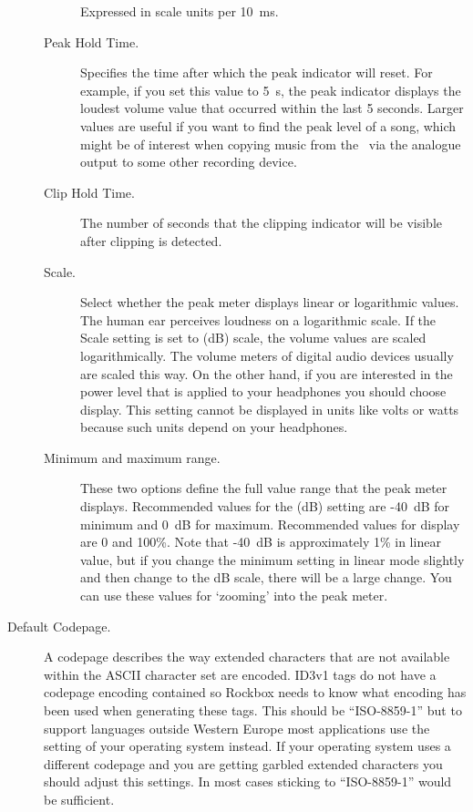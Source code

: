 \begin{description}
\begin{description}
      Expressed in scale units per 10~ms.
    \item[Peak Hold Time.]
      Specifies the time after which the peak indicator will reset.
      For example, if you set this value to 5~s, the peak indicator displays
      the loudest volume value that occurred within the last 5 seconds.
      Larger values are useful if you want to find the peak level of a song,
      which might be of interest when copying music from the \dap\ via the
      analogue output to some other recording device.
    \item[Clip Hold Time.]
      The number of seconds that the clipping indicator will be visible
      after clipping is detected.
    \item[Scale.]
      Select whether the peak meter displays linear or logarithmic values.
      The human ear perceives loudness on a logarithmic scale. If the Scale
      setting is set to  (dB) scale, the volume values
      are scaled logarithmically. The volume meters of digital audio
      devices usually are scaled this way. On the other hand, if you
      are interested in the power level that is applied to your headphones
      you should choose  display. This setting cannot be
      displayed in units like volts or watts because such units depend
      on your headphones.
    \item[Minimum and maximum range.]
      These two options define the full value range that the peak meter
      displays. Recommended values for the  (dB) setting
      are {}-40~dB for minimum and 0~dB for maximum. Recommended values
      for  display are 0 and 100\%. Note that {}-40~dB is
      approximately 1\% in linear value, but if you change the minimum
      setting in linear mode slightly and then change to the dB scale,
      there will be a large change. You can use these values for `zooming'
      into the peak meter.
    \end{description}

    \item[Default Codepage.]
      A codepage describes the way extended characters that are not available
      within the ASCII character set are encoded. ID3v1 tags do not have a
      codepage encoding contained so Rockbox needs to know what encoding has
      been used when generating these tags. This should be ``ISO-8859-1'' but
      to support languages outside Western Europe most applications use
      the setting of your operating system instead. If your operating system
      uses a different codepage and you are getting garbled extended characters
      you should adjust this settings. In most cases sticking to
      ``ISO-8859-1'' would be sufficient.
  \end{description}
